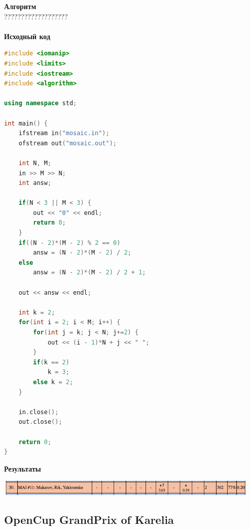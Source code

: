 \documentclass[a4paper,12pt]{article}
\begin{document}
\textbf{{\large Алгоритм}} \\
{\Huge ???????????????????} \\ 
\\
\textbf{{\large Исходный код}}
\begin{lstlisting}[language=C++]
#include <iomanip>
#include <limits>
#include <iostream>
#include <algorithm>

using namespace std;

int main() {
    ifstream in("mosaic.in");
    ofstream out("mosaic.out");

	int N, M;
	in >> M >> N;
	int answ;

	if(N < 3 || M < 3) {
		out << "0" << endl;
		return 0;
	}
	if((N - 2)*(M - 2) % 2 == 0)
		answ = (N - 2)*(M - 2) / 2;
	else
		answ = (N - 2)*(M - 2) / 2 + 1;

	out << answ << endl;

	int k = 2;
	for(int i = 2; i < M; i++) {
		for(int j = k; j < N; j+=2) {
			out << (i - 1)*N + j << " ";
		}
		if(k == 2)
			k = 3;
		else k = 2;
	}

    in.close();
    out.close();

    return 0;
}
\end{lstlisting}

\textbf{{\large Результаты}} \\
\begin{center}
\includegraphics[width=0.95\textwidth]{OC_Northern/OC_Northern_result.png}\\ [1cm]
\end{center}



%
%
\newpage
\subsection{OpenCup GrandPrix of Karelia}
\end{document}
